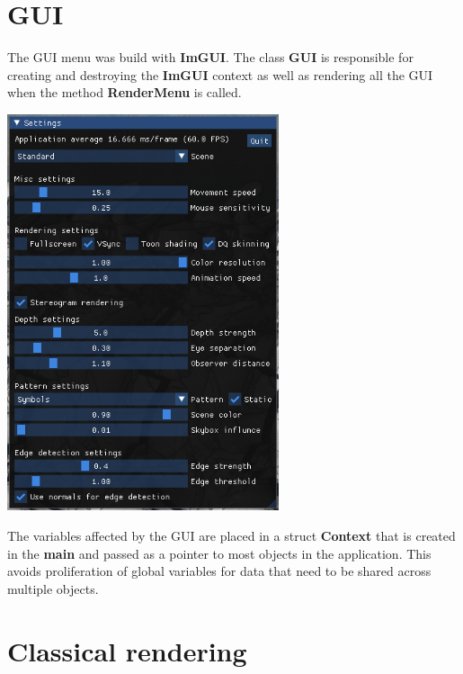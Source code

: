 \documentclass[12pt, a4paper]{article}
\begin{document}
\section{GUI}
The GUI menu was build with \textbf{ImGUI}. The class \textbf{GUI} is responsible for creating and destroying the
\textbf{ImGUI} context as well as rendering all the GUI when the method \textbf{RenderMenu} is called.
\begin{center}
    \centering
    \includegraphics[width=0.6\textwidth]{img/gui.png}
\end{center}
The variables affected by the GUI are placed in a struct \textbf{Context} that is created in the \textbf{main} and
passed as a pointer to most objects in the application. This avoids proliferation of global variables for data 
that need to be shared across multiple objects.

\section{Classical rendering}
\end{document}

